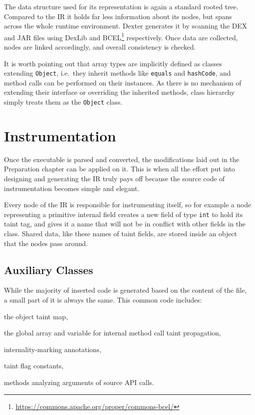 \documentclass[12pt,twoside,notitlepage]{report}
\newcommand{\weblink}[1] {\footnote{\scriptsize\url{#1}}}
\begin{document}
The data structure used for its representation is again a standard rooted tree. Compared to the IR it holds far less information about its nodes, but spans across the whole runtime environment. Dexter generates it by scanning the DEX and JAR files using DexLib and BCEL\weblink{https://commons.apache.org/proper/commons-bcel/} respectively. Once data are collected, nodes are linked accordingly, and overall consistency is checked.

It is worth pointing out that array types are implicitly defined as classes extending \verb$Object$, i.e.\ they inherit methods like \verb$equals$ and \verb$hashCode$, and method calls can be performed on their instances. As there is no mechanism of extending their interface or overriding the inherited methods, class hierarchy simply treats them as the \verb$Object$ class.

\section{Instrumentation}

Once the executable is parsed and converted, the modifications laid out in the Preparation chapter can be applied on it. This is when all the effort put into designing and generating the IR truly pays off because the source code of instrumentation becomes simple and elegant. 

Every node of the IR is responsible for instrumenting itself, so for example a node representing a primitive internal field creates a new field of type \verb$int$ to hold its taint tag, and gives it a name that will not be in conflict with other fields in the class. Shared data, like these names of taint fields, are stored inside an object that the nodes pass around.

\subsection{Auxiliary Classes}

While the majority of inserted code is generated based on the content of the file, a small part of it is always the same. This common code includes:
\begin{inparaenum}[(i)]
\item the object taint map,
\item the global array and variable for internal method call taint propagation,
\item internality-marking annotations,
\item taint flag constants,
\item methods analyzing arguments of source API calls.
\end{inparaenum}
\end{document}
